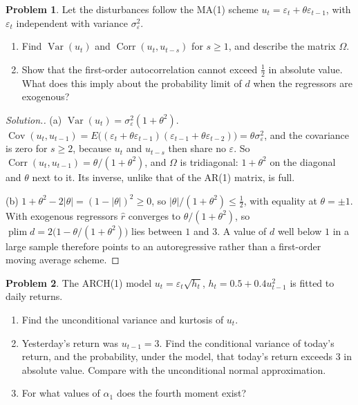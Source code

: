 \documentclass[11pt,a4paper]{article}
\numberwithin{equation}{section}
\DeclareMathOperator{\Var}{Var}
\DeclareMathOperator{\Cov}{Cov}
\DeclareMathOperator{\Corr}{Corr}
\DeclareMathOperator{\plim}{plim}
\theoremstyle{definition}
\newtheorem{problemx}{Problem}[subsection]
\newenvironment{problem}{\begin{problemx}}{\end{problemx}}
\newenvironment{solution}
  {\renewcommand{\qedsymbol}{}\begin{proof}[\textit{Solution}.]}
  {\end{proof}}
\begin{document}
\begin{problem}
Let the disturbances follow the MA(1) scheme $u_t = \varepsilon_t + \theta\varepsilon_{t-1}$, with $\varepsilon_t$ independent with variance $\sigma_\varepsilon^2$.
\begin{enumerate}[label=(\alph*)]
\item Find $\Var(u_t)$ and $\Corr(u_t, u_{t-s})$ for $s \geq 1$, and describe the matrix $\Omega$.
\item Show that the first-order autocorrelation cannot exceed $\frac12$ in absolute value. What does this imply about the probability limit of $d$ when the
regressors are exogenous?
\end{enumerate}
\end{problem}

\begin{solution}
(a) $\Var(u_t) = \sigma_\varepsilon^2(1 + \theta^2)$. $\Cov(u_t, u_{t-1}) = E\bigl((\varepsilon_t + \theta\varepsilon_{t-1})(\varepsilon_{t-1} + \theta\varepsilon_{t-2})\bigr) = \theta\sigma_\varepsilon^2$, and the covariance is zero for $s \geq 2$, because
$u_t$ and $u_{t-s}$ then share no $\varepsilon$. So $\Corr(u_t, u_{t-1}) = \theta/(1 + \theta^2)$, and $\Omega$ is tridiagonal: $1 + \theta^2$ on the diagonal and $\theta$ next to it. Its
inverse, unlike that of the AR(1) matrix, is full.

(b) $1 + \theta^2 - 2|\theta| = (1 - |\theta|)^2 \geq 0$, so $|\theta|/(1 + \theta^2) \leq \frac12$, with equality at $\theta = \pm1$. With exogenous regressors $\hat r$ converges to $\theta/(1 + \theta^2)$, so
$\plim d = 2\bigl(1 - \theta/(1 + \theta^2)\bigr)$ lies between $1$ and $3$. A value of $d$ well below $1$ in a large sample therefore points to an autoregressive rather
than a first-order moving average scheme.
\end{solution}

\begin{problem}
The ARCH(1) model $u_t = \varepsilon_t\sqrt{h_t}$, $h_t = 0.5 + 0.4u_{t-1}^2$ is fitted to daily returns.
\begin{enumerate}[label=(\alph*)]
\item Find the unconditional variance and kurtosis of $u_t$.
\item Yesterday's return was $u_{t-1} = 3$. Find the conditional variance of today's return, and the probability, under the model, that today's return
exceeds $3$ in absolute value. Compare with the unconditional normal approximation.
\item For what values of $\alpha_1$ does the fourth moment exist?
\end{enumerate}
\end{problem}
\end{document}

